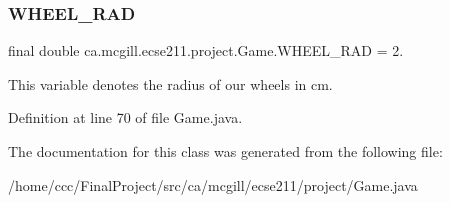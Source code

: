 \subsubsection{\texorpdfstring{W\+H\+E\+E\+L\+\_\+\+R\+AD}{WHEEL\_RAD}}
{\footnotesize\ttfamily final double ca.\+mcgill.\+ecse211.\+project.\+Game.\+W\+H\+E\+E\+L\+\_\+\+R\+AD = 2.\hspace{0.3cm}{\ttfamily [static]}}

This variable denotes the radius of our wheels in cm. 

Definition at line 70 of file Game.\+java.



The documentation for this class was generated from the following file\+:\begin{DoxyCompactItemize}
\item 
/home/ccc/\+Final\+Project/src/ca/mcgill/ecse211/project/Game.\+java\end{DoxyCompactItemize}
